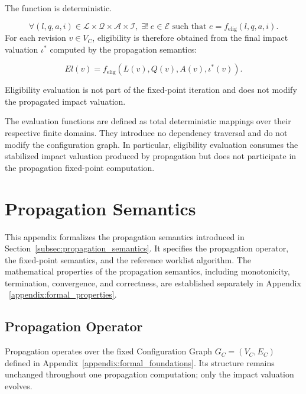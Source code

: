 \documentclass[10pt]{article}
\begin{document}
The function is deterministic.

\begin{equation}
	\forall
	(l,q,a,i)
	\in
	\mathcal{L}
	\times
	\mathcal{Q}
	\times
	\mathcal{A}
	\times
	\mathcal{I},
	\;
	\exists!\;
	e
	\in
	\mathcal{E}
	\text{ such that }
	e
	=
	f_{\mathrm{elig}}(l,q,a,i).
	\label{eq:eligibility_deterministic}
\end{equation}
For each revision $v\in V_C$, eligibility is therefore obtained from the final
impact valuation $\iota^{*}$ computed by the propagation semantics:

\begin{equation}
	El(v)
	=
	f_{\mathrm{elig}}
	\left(
	L(v),
	Q(v),
	A(v),
	\iota^{*}(v)
	\right).
	\label{eq:eligibility_from_fixed_impact}
\end{equation}

Eligibility evaluation is not part of the fixed-point iteration and does not modify the propagated impact valuation.

The evaluation functions are defined as total deterministic mappings over their respective finite domains. They introduce no dependency traversal and do not modify the configuration graph. In particular, eligibility evaluation consumes the stabilized impact valuation produced by propagation but does not participate in the propagation fixed-point computation.

\section{Propagation Semantics}
\label{appendix:propagation_semantics}

This appendix formalizes the propagation semantics introduced in
Section~\ref{subsec:propagation_semantics}. It specifies the propagation operator, the fixed-point semantics, and the reference worklist algorithm.
The mathematical properties of the propagation semantics, including monotonicity, termination, convergence, and correctness, are established separately in Appendix ~\ref{appendix:formal_properties}.

\subsection{Propagation Operator}

Propagation operates over the fixed Configuration Graph
$G_C=(V_C,E_C)$ defined in Appendix~\ref{appendix:formal_foundations}.
Its structure remains unchanged throughout one propagation computation; only the impact valuation evolves.
\end{document}
